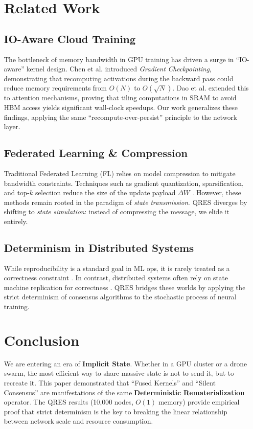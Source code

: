 \documentclass[conference]{IEEEtran}
\begin{document}
\section{Related Work}

\subsection{IO-Aware Cloud Training}
The bottleneck of memory bandwidth in GPU training has driven a surge in ``IO-aware'' kernel design. Chen et al. \cite{chen2016training} introduced \textit{Gradient Checkpointing}, demonstrating that recomputing activations during the backward pass could reduce memory requirements from $O(N)$ to $O(\sqrt{N})$. Dao et al. \cite{dao2022flashattention} extended this to attention mechanisms, proving that tiling computations in SRAM to avoid HBM access yields significant wall-clock speedups. Our work generalizes these findings, applying the same ``recompute-over-persist'' principle to the network layer.

\subsection{Federated Learning \& Compression}
Traditional Federated Learning (FL) relies on model compression to mitigate bandwidth constraints. Techniques such as gradient quantization, sparsification, and top-$k$ selection reduce the size of the update payload $\Delta W$ \cite{kairouz2021advances}. However, these methods remain rooted in the paradigm of \textit{state transmission}. QRES diverges by shifting to \textit{state simulation}: instead of compressing the message, we elide it entirely.

\subsection{Determinism in Distributed Systems}
While reproducibility is a standard goal in ML ops, it is rarely treated as a correctness constraint \cite{jain2019reproducibility}. In contrast, distributed systems often rely on state machine replication for correctness \cite{geels2006frugal}. QRES bridges these worlds by applying the strict determinism of consensus algorithms to the stochastic process of neural training.

\section{Conclusion}
We are entering an era of \textbf{Implicit State}. Whether in a GPU cluster or a drone swarm, the most efficient way to share massive state is not to send it, but to recreate it. This paper demonstrated that ``Fused Kernels'' and ``Silent Consensus'' are manifestations of the same \textbf{Deterministic Rematerialization} operator. The QRES results (10,000 nodes, $O(1)$ memory) provide empirical proof that strict determinism is the key to breaking the linear relationship between network scale and resource consumption.
\end{document}
